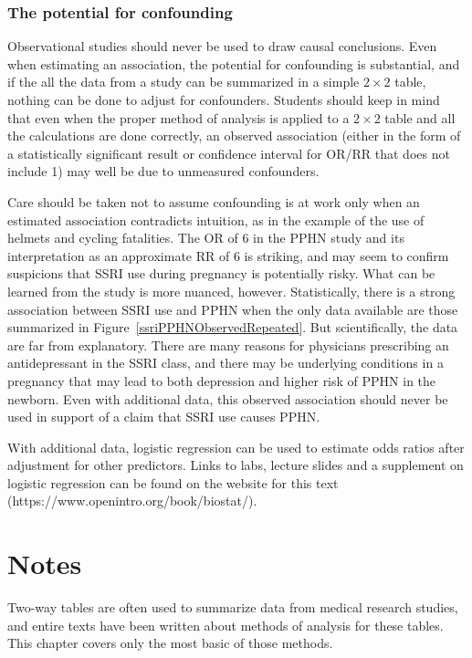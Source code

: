 \subsubsection{The potential for confounding}

Observational studies should never be used to draw causal conclusions.  Even when estimating an association, the potential for confounding is substantial, and if the all the data from a study can be summarized in a simple $2 \times 2$ table, nothing can be done to adjust for confounders.  Students should keep in mind that even when the proper method of analysis is applied to a $2 \times 2$ table and all the calculations are done correctly, an observed association (either in the form of a statistically significant result or confidence interval for OR/RR that does not include 1) may well be due to unmeasured confounders.  

Care should be taken not to assume confounding is at work only when an estimated association contradicts intuition, as in the example of the use of helmets and cycling fatalities.  The OR of 6 in the PPHN study and its interpretation as an approximate RR of 6 is striking, and may seem to confirm suspicions that SSRI use during pregnancy is potentially risky.  What can be learned from the study is more nuanced, however. Statistically, there is a strong association between SSRI use and PPHN when the only data available are those summarized in Figure~\ref{ssriPPHNObservedRepeated}. But scientifically, the data are far from explanatory.   There are many reasons for physicians prescribing an antidepressant in the SSRI class, and there  may be underlying conditions in a pregnancy that may lead to both depression and higher risk of PPHN in the newborn.   Even with additional data, this observed association should never be used in support of a claim that SSRI use causes PPHN.  

With additional data, logistic regression can be used to estimate odds ratios after adjustment for other predictors. Links to labs, lecture slides and a supplement on logistic regression can be found on the website for this text (https://www.openintro.org/book/biostat/).


\section{Notes}
\label{infForPropNotes}

Two-way tables are often used to summarize data from medical research studies, and entire texts have been written about methods of analysis for these tables.  This chapter covers only the most basic of those methods. 


